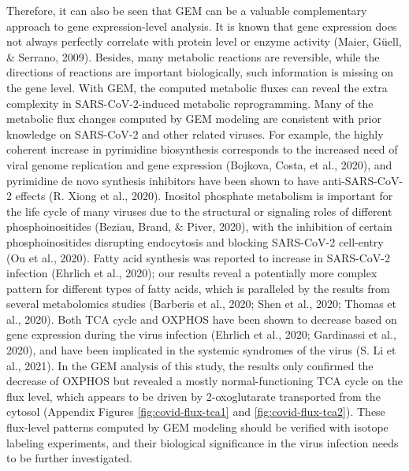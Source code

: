 \documentclass[12pt,twoside,openany,\mydriver]{thesis}  %
\begin{document}
Therefore, it can also be seen that GEM can be a valuable complementary approach to gene expression-level analysis. It is known that gene expression does not always perfectly correlate with protein level or enzyme activity (Maier, Güell, \& Serrano, 2009). Besides, many metabolic reactions are reversible, while the directions of reactions are important biologically, such information is missing on the gene level. With GEM, the computed metabolic fluxes can reveal the extra complexity in SARS-CoV-2-induced metabolic reprogramming. Many of the metabolic flux changes computed by GEM modeling are consistent with prior knowledge on SARS-CoV-2 and other related viruses. For example, the highly coherent increase in pyrimidine biosynthesis corresponds to the increased need of viral genome replication and gene expression (Bojkova, Costa, et al., 2020), and pyrimidine de novo synthesis inhibitors have been shown to have anti-SARS-CoV-2 effects (R. Xiong et al., 2020). Inositol phosphate metabolism is important for the life cycle of many viruses due to the structural or signaling roles of different phosphoinositides (Beziau, Brand, \& Piver, 2020), with the inhibition of certain phosphoinositides disrupting endocytosis and blocking SARS-CoV-2 cell-entry (Ou et al., 2020). Fatty acid synthesis was reported to increase in SARS-CoV-2 infection (Ehrlich et al., 2020); our results reveal a potentially more complex pattern for different types of fatty acids, which is paralleled by the results from several metabolomics studies (Barberis et al., 2020; Shen et al., 2020; Thomas et al., 2020). Both TCA cycle and OXPHOS have been shown to decrease based on gene expression during the virus infection (Ehrlich et al., 2020; Gardinassi et al., 2020), and have been implicated in the systemic syndromes of the virus (S. Li et al., 2021). In the GEM analysis of this study, the results only confirmed the decrease of OXPHOS but revealed a mostly normal-functioning TCA cycle on the flux level, which appears to be driven by 2-oxoglutarate transported from the cytosol (Appendix Figures \ref{fig:covid-flux-tca1} and \ref{fig:covid-flux-tca2}). These flux-level patterns computed by GEM modeling should be verified with isotope labeling experiments, and their biological significance in the virus infection needs to be further investigated.
\end{document}
